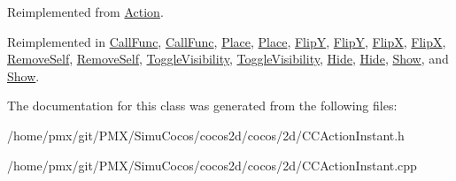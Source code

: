 Reimplemented from \hyperlink{classAction_a937e646e63915e33ad05ba149bfcf239}{Action}.



Reimplemented in \hyperlink{classCallFunc_a6684fe74294f93ba202ae8599e890c0c}{Call\+Func}, \hyperlink{classCallFunc_a935c2f87c96d2a5b9e78b1ca875e9d7a}{Call\+Func}, \hyperlink{classPlace_a1ab3900efa596c098e0fb84232050435}{Place}, \hyperlink{classPlace_ac1096e69dd514a74920ae060ab1b671f}{Place}, \hyperlink{classFlipY_a51936fab0a0dc692e381a8a89c3d8e43}{FlipY}, \hyperlink{classFlipY_a75442be63f171b641a1f98165e915439}{FlipY}, \hyperlink{classFlipX_a7722cb20061b1e1708581585a1e2f1b3}{FlipX}, \hyperlink{classFlipX_ac83f96bee0cebd14b4d06813bd259047}{FlipX}, \hyperlink{classRemoveSelf_ae77d0c282e5eba09f092ebec570fbc71}{Remove\+Self}, \hyperlink{classRemoveSelf_a362b4453b4b247e9b4b7e51fc1bd7c44}{Remove\+Self}, \hyperlink{classToggleVisibility_a2d217511fd3f28ee096e0de1aacf21b4}{Toggle\+Visibility}, \hyperlink{classToggleVisibility_a7a00173aaded366259698c37ebbb2ca0}{Toggle\+Visibility}, \hyperlink{classHide_ab63f0961b2bac19ff3fa4581e7342d9d}{Hide}, \hyperlink{classHide_a108b8127537cc5da94f63444e3fb23f3}{Hide}, \hyperlink{classShow_a83db57e795e0269471d06d4e49986ab0}{Show}, and \hyperlink{classShow_a81b501eda1e567344ad4ecf695b1be86}{Show}.



The documentation for this class was generated from the following files\+:\begin{DoxyCompactItemize}
\item 
/home/pmx/git/\+P\+M\+X/\+Simu\+Cocos/cocos2d/cocos/2d/C\+C\+Action\+Instant.\+h\item 
/home/pmx/git/\+P\+M\+X/\+Simu\+Cocos/cocos2d/cocos/2d/C\+C\+Action\+Instant.\+cpp\end{DoxyCompactItemize}
